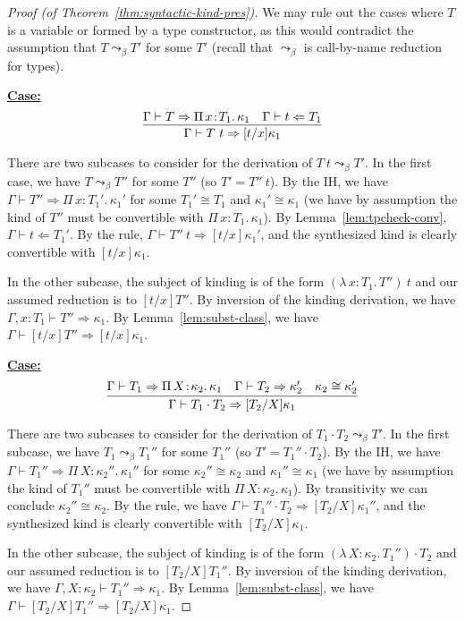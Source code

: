 \documentclass{article}
\newcommand{\abs}[4]{{#1}\, #2\! : \! #3.\, #4}
\newcommand{\tpcheck}[0]{\Leftarrow}
\newcommand{\tpsynth}[0]{\Rightarrow}
\newcommand{\startcase}[1]{\vspace{#1} \noindent\textbf{\underline{Case:}}}
\begin{document}
\begin{proof}[Proof (of Theorem~\ref{thm:syntactic-kind-pres})]
  We may rule out the cases where \(T\) is a variable or formed by a type
  constructor, as this would contradict the assumption that \(T \leadsto_{\beta}
  T'\) for some \(T'\) (recall that \(\leadsto_\beta\) is call-by-name reduction
  for types).

  \startcase{.2cm}
  \[
    \infer{\Gamma\vdash T\ t \tpsynth [t/x]\kappa_1}{\Gamma\vdash T \tpsynth
      \abs{\Pi}{x}{T_1}{\kappa_1} & \Gamma\vdash t \tpcheck T_1}
  \]

  There are two subcases to consider for the derivation of \(T\ t \leadsto_\beta
  T'\). In the first case, we have \(T \leadsto_\beta T''\) for some \(T''\) (so
  \(T' = T''\ t\)). By the IH, we have \(\Gamma \vdash T'' \tpsynth
  \abs{\Pi}{x}{T_1'}{\kappa_1'}\) for some \(T_1' \cong T_1\) and \(\kappa_1'
  \cong \kappa_1\) (we have by assumption the kind of \(T''\) must be
  convertible with \(\abs{\Pi}{x}{T_1}{\kappa_1}\)). By
  Lemma~\ref{lem:tpcheck-conv}, \(\Gamma \vdash t \tpcheck T_1'\). By the rule,
  \(\Gamma \vdash T''\ t \tpsynth [t/x]\kappa_1'\), and the synthesized kind is
  clearly convertible with \([t/x]\kappa_1\).

  In the other subcase, the subject of kinding is of the form
  \((\abs{\lambda}{x}{T_1}{T''})\ t\) and our assumed reduction is to
  \([t/x]T''\). By inversion of the kinding derivation, we have \(\Gamma,x:T_1
  \vdash T'' \tpsynth \kappa_1\). By Lemma~\ref{lem:subst-class}, we have
  \(\Gamma \vdash [t/x]T'' \tpsynth [t/x]\kappa_1\).

  \startcase{.2cm}
  \[
    \infer{\Gamma\vdash T_1 \cdot T_2 \tpsynth [T_2/X]\kappa_1}{\Gamma\vdash T_1
      \tpsynth \abs{\Pi}{X}{\kappa_2}{\kappa_1} & \Gamma\vdash T_2 \tpsynth
      \kappa_2' & \kappa_2 \cong \kappa_2'}
  \]

  There are two subcases to consider for the derivation of \(T_1 \cdot T_2
  \leadsto_\beta T'\). In the first subcase, we have \(T_1 \leadsto_\beta
  T_1''\) for some \(T_1''\) (so \(T' = T_1'' \cdot T_2\)). By the IH, we have
  \(\Gamma \vdash T_1'' \tpsynth \abs{\Pi}{X}{\kappa_2''}{\kappa_1''}\) for some
  \(\kappa_2'' \cong \kappa_2\) and \(\kappa_1'' \cong \kappa_1\) (we have by
  assumption the kind of \(T_1''\) must be convertible with
  \(\abs{\Pi}{X}{\kappa_2}{\kappa_1}\)). By transitivity we can conclude
  \(\kappa_2'' \cong \kappa_2\). By the rule, we have \(\Gamma \vdash T_1''
  \cdot T_2 \tpsynth [T_2/X]\kappa_1''\), and the synthesized kind is clearly
  convertible with \([T_2/X]\kappa_1\).

  In the other subcase, the subject of kinding is of the form
  \((\abs{\lambda}{X}{\kappa_2}{T_1''}) \cdot T_2\) and our assumed reduction is
  to \([T_2/X]T_1''\). By inversion of the kinding derivation, we have
  \(\Gamma,X:\kappa_2 \vdash T_1'' \tpsynth \kappa_1\). By
  Lemma~\ref{lem:subst-class}, we have \(\Gamma \vdash [T_2/X]T_1'' \tpsynth
  [T_2/X]\kappa_1\).

\end{proof}
\end{document}
